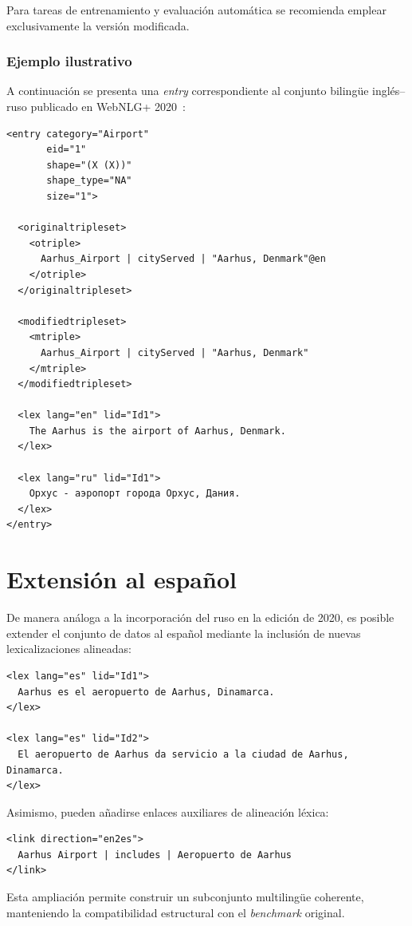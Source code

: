 Para tareas de entrenamiento y evaluación automática se recomienda emplear
exclusivamente la versión modificada.

\subsubsection{Ejemplo ilustrativo}
A continuación se presenta una \textit{entry} correspondiente al conjunto
bilingüe inglés--ruso publicado en WebNLG+ 2020~\cite{CastroFerreira2020}:

\begin{verbatim}
<entry category="Airport"
       eid="1"
       shape="(X (X))"
       shape_type="NA"
       size="1">

  <originaltripleset>
    <otriple>
      Aarhus_Airport | cityServed | "Aarhus, Denmark"@en
    </otriple>
  </originaltripleset>

  <modifiedtripleset>
    <mtriple>
      Aarhus_Airport | cityServed | "Aarhus, Denmark"
    </mtriple>
  </modifiedtripleset>

  <lex lang="en" lid="Id1">
    The Aarhus is the airport of Aarhus, Denmark.
  </lex>

  <lex lang="ru" lid="Id1">
    Орхус - аэропорт города Орхус, Дания.
  </lex>
</entry>
\end{verbatim}

\section{Extensión al español}

De manera análoga a la incorporación del ruso en la edición de 2020, es posible
extender el conjunto de datos al español mediante la inclusión de nuevas
lexicalizaciones alineadas:

\begin{verbatim}
<lex lang="es" lid="Id1">
  Aarhus es el aeropuerto de Aarhus, Dinamarca.
</lex>

<lex lang="es" lid="Id2">
  El aeropuerto de Aarhus da servicio a la ciudad de Aarhus, Dinamarca.
</lex>
\end{verbatim}

Asimismo, pueden añadirse enlaces auxiliares de alineación léxica:

\begin{verbatim}
<link direction="en2es">
  Aarhus Airport | includes | Aeropuerto de Aarhus
</link>
\end{verbatim}

Esta ampliación permite construir un subconjunto multilingüe coherente,
manteniendo la compatibilidad estructural con el \textit{benchmark} original.
